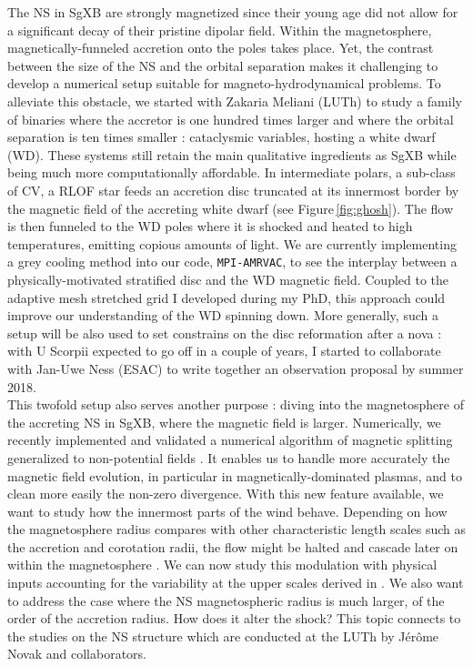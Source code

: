 \documentclass[a4paper,12pt,onecolumn]{article}
\newcommand{\sgx}{SgXB\xspace}
\begin{document}
The NS in \sgx are strongly magnetized since their young age did not allow for a significant decay of their pristine dipolar field. Within the magnetosphere, magnetically-funneled accretion onto the poles takes place. Yet, the contrast between the size of the NS and the orbital separation makes it challenging to develop a numerical setup suitable for magneto-hydrodynamical problems. To alleviate this obstacle, we started with Zakaria Meliani (LUTh) to study a family of binaries where the accretor is one hundred times larger and where the orbital separation is ten times smaller : cataclysmic variables, hosting a white dwarf (WD). These systems still retain the main qualitative ingredients as \sgx while being much more computationally affordable. In intermediate polars, a sub-class of CV, a RLOF star feeds an accretion disc truncated at its innermost border by the magnetic field of the accreting white dwarf (see Figure\,\ref{fig:ghosh}). The flow is then funneled to the WD poles where it is shocked and heated to high temperatures, emitting copious amounts of light. We are currently implementing a grey cooling method into our code, \texttt{MPI-AMRVAC}, to see the interplay between a physically-motivated stratified disc and the WD magnetic field. Coupled to the adaptive mesh stretched grid I developed during my PhD, this approach could improve our understanding of the WD spinning down. More generally, such a setup will be also used to set constrains on the disc reformation after a nova \citep{Ness2012} : with U Scorpii expected to go off in a couple of years, I started to collaborate with Jan-Uwe Ness (ESAC) to write together an observation proposal by summer 2018.\\
\indent This twofold setup also serves another purpose : diving into the magnetosphere of the accreting NS in \sgx, where the magnetic field is larger. Numerically, we recently implemented and validated a numerical algorithm of magnetic splitting generalized to non-potential fields \citep{Xia2017}. It enables us to handle more accurately the magnetic field evolution, in particular in magnetically-dominated plasmas, and to clean more easily the non-zero divergence. With this new feature available, we want to study how the innermost parts of the wind behave. Depending on how the magnetosphere radius compares with other characteristic length scales such as the accretion and corotation radii, the flow might be halted and cascade later on within the magnetosphere \citep{Bozzo2008}. We can now study this modulation with physical inputs accounting for the variability at the upper scales derived in \cite{ElMellah}. We also want to address the case where the NS magnetospheric radius is much larger, of the order of the accretion radius. How does it alter the shock? This topic connects to the studies on the NS structure which are conducted at the LUTh by J\'er\^ome Novak and collaborators.
 	
\end{document}
